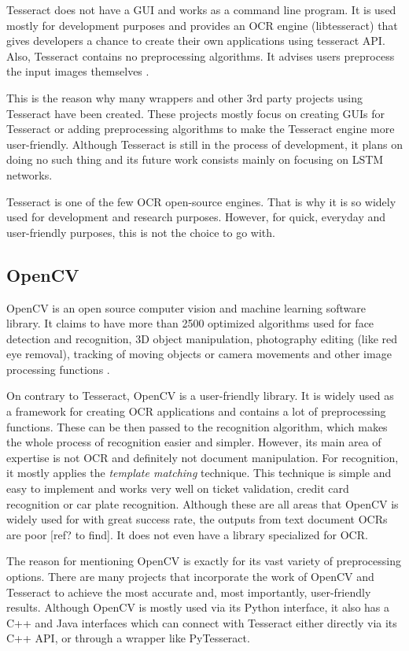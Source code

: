 Tesseract does not have a GUI and works as a command line program. It is used mostly for development purposes and provides an OCR engine (libtesseract) that gives developers a chance to create their own applications using tesseract API. Also, Tesseract contains no preprocessing algorithms. It advises users preprocess the input images themselves \citep{TesseractQual}.

This is the reason why many wrappers and other 3rd party projects using Tesseract have been created. These projects mostly focus on creating GUIs for Tesseract or adding preprocessing algorithms to make the Tesseract engine more user-friendly. Although Tesseract is still in the process of development, it plans on doing no such thing and its future work consists mainly on focusing on LSTM networks.

Tesseract is one of the few OCR open-source engines. That is why it is so widely used for development and research purposes. However, for quick, everyday and user-friendly purposes, this is not the choice to go with.

\subsection{OpenCV}

OpenCV is an open source computer vision and machine learning software library. It claims to have more than 2500 optimized algorithms used for face detection and recognition, 3D object manipulation, photography editing (like red eye removal), tracking of moving objects or camera movements and other image processing functions \citep{OpenCV}.

On contrary to Tesseract, OpenCV is a user-friendly library. It is widely used as a framework for creating OCR applications and contains a lot of preprocessing functions. These can be then passed to the recognition algorithm, which makes the whole process of recognition easier and simpler. However, its main area of expertise is not OCR and definitely not document manipulation. For recognition, it mostly applies the \emph{template matching} technique. This technique is simple and easy to implement and works very well on ticket validation, credit card recognition or car plate recognition. Although these are all areas that OpenCV is widely used for with great success rate, the outputs from text document OCRs are poor [ref? to find]. It does not even have a library specialized for OCR.

The reason for mentioning OpenCV is exactly for its vast variety of preprocessing options. There are many projects that incorporate the work of OpenCV and Tesseract to achieve the most accurate and, most importantly, user-friendly results. Although OpenCV is mostly used via its Python interface, it also has a C++ and Java interfaces which can connect with Tesseract either directly via its C++ API, or through a wrapper like PyTesseract.

